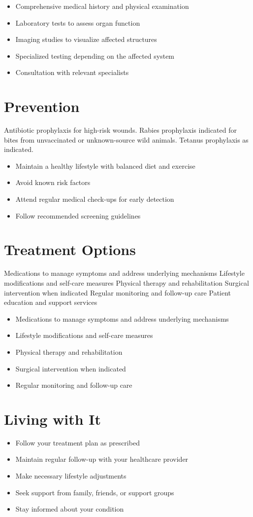 \begin{itemize}[noitemsep]
  \item Comprehensive medical history and physical examination
  \item Laboratory tests to assess organ function
  \item Imaging studies to visualize affected structures
  \item Specialized testing depending on the affected system
  \item Consultation with relevant specialists
\end{itemize}
\section{Prevention}
Antibiotic prophylaxis for high-risk wounds. Rabies prophylaxis indicated for bites from unvaccinated or unknown-source wild animals. Tetanus prophylaxis as indicated.

\begin{itemize}[noitemsep]
  \item Maintain a healthy lifestyle with balanced diet and exercise
  \item Avoid known risk factors
  \item Attend regular medical check-ups for early detection
  \item Follow recommended screening guidelines
\end{itemize}
\section{Treatment Options}
Medications to manage symptoms and address underlying mechanisms Lifestyle modifications and self-care measures Physical therapy and rehabilitation Surgical intervention when indicated Regular monitoring and follow-up care Patient education and support services

\begin{itemize}[noitemsep]
  \item Medications to manage symptoms and address underlying mechanisms
  \item Lifestyle modifications and self-care measures
  \item Physical therapy and rehabilitation
  \item Surgical intervention when indicated
  \item Regular monitoring and follow-up care
\end{itemize}
\section{Living with It}
\begin{itemize}[noitemsep]
  \item Follow your treatment plan as prescribed
  \item Maintain regular follow-up with your healthcare provider
  \item Make necessary lifestyle adjustments
  \item Seek support from family, friends, or support groups
  \item Stay informed about your condition
\end{itemize}
